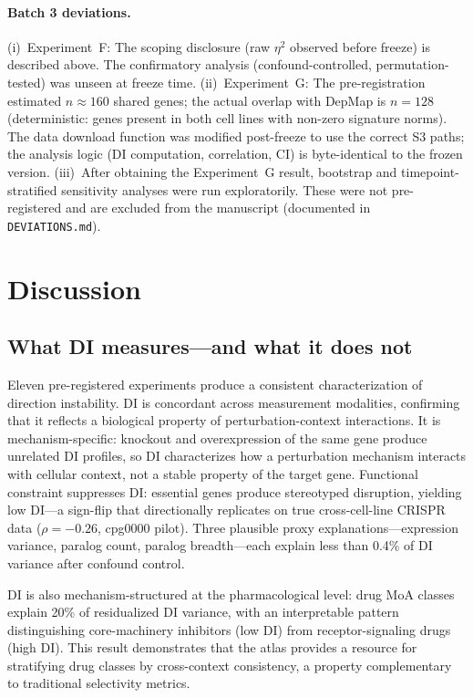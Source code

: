 \documentclass[11pt]{article}
\begin{document}
\paragraph{Batch 3 deviations.}
(i)~Experiment~F: The scoping disclosure (raw $\eta^2$ observed before
freeze) is described above.  The confirmatory analysis
(confound-controlled, permutation-tested) was unseen at freeze time.
(ii)~Experiment~G: The pre-registration estimated $n \approx 160$ shared
genes; the actual overlap with DepMap is $n = 128$ (deterministic:
genes present in both cell lines with non-zero signature norms).
The data download function was modified post-freeze to use the correct
S3 paths; the analysis logic (DI computation, correlation, CI) is
byte-identical to the frozen version.
(iii)~After obtaining the Experiment~G result, bootstrap and
timepoint-stratified sensitivity analyses were run exploratorily.
These were not pre-registered and are excluded from the manuscript
(documented in \texttt{DEVIATIONS.md}).


\section{Discussion}
\label{sec:discussion}

\subsection{What DI measures---and what it does not}

Eleven pre-registered experiments produce a consistent characterization
of direction instability.  DI is concordant across measurement
modalities, confirming that it reflects a biological property of
perturbation-context interactions.  It is mechanism-specific: knockout
and overexpression of the same gene produce unrelated DI profiles, so DI
characterizes how a perturbation mechanism interacts with cellular
context, not a stable property of the target gene.  Functional
constraint suppresses DI: essential genes produce stereotyped disruption,
yielding low DI---a sign-flip that directionally replicates on true
cross-cell-line CRISPR data ($\rho = -0.26$, cpg0000 pilot).  Three
plausible proxy explanations---expression variance, paralog count,
paralog breadth---each explain less than 0.4\% of DI variance after
confound control.

DI is also mechanism-structured at the pharmacological level: drug MoA
classes explain 20\% of residualized DI variance, with an interpretable
pattern distinguishing core-machinery inhibitors (low DI) from
receptor-signaling drugs (high DI).  This result demonstrates that the
atlas provides a resource for stratifying drug classes by cross-context
consistency, a property complementary to traditional selectivity
metrics.
\end{document}
